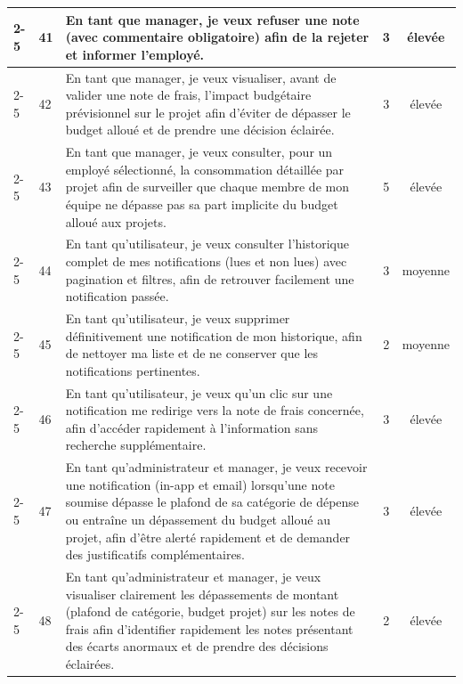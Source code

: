 \documentclass[12pt,a4paper]{report}
\begin{document}
\begin{longtable}{|p{2cm}|p{1cm}|p{8.3cm}|c|c|}
\cline{2-5}

& 41 & En tant que manager, je veux refuser une note (avec commentaire obligatoire) afin de la rejeter et informer l’employé. & 3 & élevée \\

\cline{2-5}

& 42 & En tant que manager, je veux visualiser, avant de valider une note de frais, l'impact budgétaire prévisionnel sur le projet afin d'éviter de dépasser le budget alloué et de prendre une décision éclairée. & 3 & élevée \\

\cline{2-5}

& 43 & En tant que manager, je veux consulter, pour un employé sélectionné, la consommation détaillée par projet afin de surveiller que chaque membre de mon équipe ne dépasse pas sa part implicite du budget alloué aux projets. & 5 & élevée \\

\cline{2-5}

& 44 & En tant qu'utilisateur, je veux consulter l'historique complet de mes notifications (lues et non lues) avec pagination et filtres, afin de retrouver facilement une notification passée. & 3 & moyenne \\

\cline{2-5}

& 45 & En tant qu'utilisateur, je veux supprimer définitivement une notification de mon historique, afin de nettoyer ma liste et de ne conserver que les notifications pertinentes. & 2 & moyenne \\

\cline{2-5}

& 46 & En tant qu'utilisateur, je veux qu’un clic sur une notification me redirige vers la note de frais concernée, afin d’accéder rapidement à l’information sans recherche supplémentaire. & 3 & élevée \\

\cline{2-5}

& 47 & En tant qu'administrateur et manager, je veux recevoir une notification (in-app et email) lorsqu'une note soumise dépasse le plafond de sa catégorie de dépense ou entraîne un dépassement du budget alloué au projet, afin d'être alerté rapidement et de demander des justificatifs complémentaires. & 3 & élevée \\

\cline{2-5}

& 48 & En tant qu'administrateur et manager, je veux visualiser clairement les dépassements de montant (plafond de catégorie, budget projet) sur les notes de frais afin d'identifier rapidement les notes présentant des écarts anormaux et de prendre des décisions éclairées. & 2 & élevée \\


\end{longtable}
\end{document}
